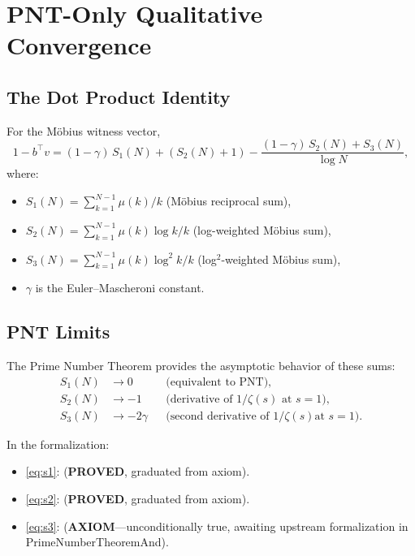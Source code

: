 \documentclass[11pt,a4paper]{article}
\begin{document}
\section{PNT-Only Qualitative Convergence}
\label{sec:pnt}

\subsection{The Dot Product Identity}

\begin{theorem}
\label{thm:dotident}
For the M\"obius witness vector,
\[
  1 - b^\top v = (1 - \gamma)\,S_1(N) + (S_2(N) + 1)
    - \frac{(1-\gamma)\,S_2(N) + S_3(N)}{\log N},
\]
where:
\begin{itemize}
  \item $S_1(N) = \sum_{k=1}^{N-1} \mu(k)/k$ \quad
    (M\"obius reciprocal sum),
  \item $S_2(N) = \sum_{k=1}^{N-1} \mu(k)\log k/k$ \quad
    (log-weighted M\"obius sum),
  \item $S_3(N) = \sum_{k=1}^{N-1} \mu(k)\log^2 k/k$ \quad
    (log$^2$-weighted M\"obius sum),
  \item $\gamma$ is the Euler--Mascheroni constant.
\end{itemize}
\end{theorem}

\subsection{PNT Limits}

The Prime Number Theorem provides the asymptotic behavior of these
sums:
\begin{align}
  S_1(N) &\to 0 &&\text{(equivalent to PNT),} \label{eq:s1} \\
  S_2(N) &\to -1 &&\text{(derivative of $1/\zeta(s)$ at $s=1$),}
    \label{eq:s2} \\
  S_3(N) &\to -2\gamma &&\text{(second derivative of $1/\zeta(s)$
    at $s=1$).} \label{eq:s3}
\end{align}

\noindent
In the formalization:
\begin{itemize}
  \item \eqref{eq:s1}: 
    (\textbf{PROVED}, graduated from axiom).
  \item \eqref{eq:s2}: 
    (\textbf{PROVED}, graduated from axiom).
  \item \eqref{eq:s3}: 
    (\textbf{AXIOM}---unconditionally true, awaiting upstream
    formalization in PrimeNumberTheoremAnd).
\end{itemize}
\end{document}
